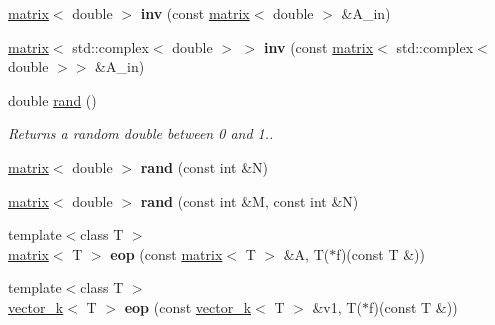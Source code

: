 \begin{DoxyCompactItemize}
\item 
\hypertarget{namespacekeycpp_adc96927cda2df7a6e8e2031941c43601}{\hyperlink{classkeycpp_1_1matrix}{matrix}$<$ double $>$ {\bfseries inv} (const \hyperlink{classkeycpp_1_1matrix}{matrix}$<$ double $>$ \&A\-\_\-in)}\label{namespacekeycpp_adc96927cda2df7a6e8e2031941c43601}

\item 
\hypertarget{namespacekeycpp_a6b74369f5415c3ed45f63995149ad992}{\hyperlink{classkeycpp_1_1matrix}{matrix}$<$ std\-::complex$<$ double $>$ $>$ {\bfseries inv} (const \hyperlink{classkeycpp_1_1matrix}{matrix}$<$ std\-::complex$<$ double $>$$>$ \&A\-\_\-in)}\label{namespacekeycpp_a6b74369f5415c3ed45f63995149ad992}

\item 
\hypertarget{namespacekeycpp_a5ef5c1f5951e8182a7c4ec9612f3f7e1}{double \hyperlink{namespacekeycpp_a5ef5c1f5951e8182a7c4ec9612f3f7e1}{rand} ()}\label{namespacekeycpp_a5ef5c1f5951e8182a7c4ec9612f3f7e1}

\begin{DoxyCompactList}\small\item\em Returns a random double between 0 and 1.. \end{DoxyCompactList}\item 
\hypertarget{namespacekeycpp_ac224964eb5e1a55c3f7d58f0e9b71d3d}{\hyperlink{classkeycpp_1_1matrix}{matrix}$<$ double $>$ {\bfseries rand} (const int \&N)}\label{namespacekeycpp_ac224964eb5e1a55c3f7d58f0e9b71d3d}

\item 
\hypertarget{namespacekeycpp_ae5c4b142a4101e9bb1df9f19efaf7d2f}{\hyperlink{classkeycpp_1_1matrix}{matrix}$<$ double $>$ {\bfseries rand} (const int \&M, const int \&N)}\label{namespacekeycpp_ae5c4b142a4101e9bb1df9f19efaf7d2f}

\item 
\hypertarget{namespacekeycpp_aae90693acdaf666bd23bf861f2c0d28c}{{\footnotesize template$<$class T $>$ }\\\hyperlink{classkeycpp_1_1matrix}{matrix}$<$ T $>$ {\bfseries eop} (const \hyperlink{classkeycpp_1_1matrix}{matrix}$<$ T $>$ \&A, T($\ast$f)(const T \&))}\label{namespacekeycpp_aae90693acdaf666bd23bf861f2c0d28c}

\item 
\hypertarget{namespacekeycpp_a6c6542964c7aaaccbee336567f64c03c}{{\footnotesize template$<$class T $>$ }\\\hyperlink{classkeycpp_1_1vector__k}{vector\-\_\-k}$<$ T $>$ {\bfseries eop} (const \hyperlink{classkeycpp_1_1vector__k}{vector\-\_\-k}$<$ T $>$ \&v1, T($\ast$f)(const T \&))}\label{namespacekeycpp_a6c6542964c7aaaccbee336567f64c03c}


\end{DoxyCompactItemize}
